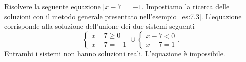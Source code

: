\begin{exrig}
\begin{esempio}
Risolvere la seguente equazione $\left|x-7\right|=-1$.
Impostiamo la ricerca delle soluzioni con il metodo generale presentato nell'esempio~\ref{es:7.3}. L'equazione corrisponde alla soluzione dell'unione dei due sistemi seguenti
\[\left\{\begin{array}{l}{x-7\ge 0}\\{x-7=-1}\end{array}\right. \cup \left\{\begin{array}{l}{x-7<0}\\{x-7=1}\end{array}\right..\]
Entrambi i sistemi non hanno soluzioni reali. L'equazione è impossibile.
\end{esempio}
\end{exrig}
\ovalbox{\risolvii \ref{ese:7.3}, \ref{ese:7.4}, \ref{ese:7.5}, \ref{ese:7.6}, \ref{ese:7.7}}

